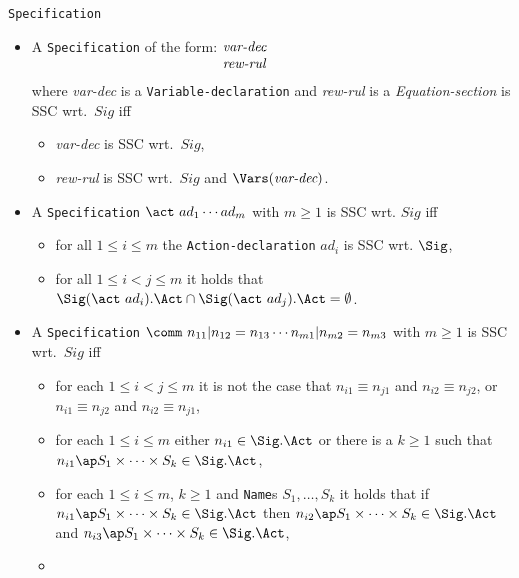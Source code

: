 \documentclass[twoside,fleqn,a4paper,dvips]{article}
\begin{document}
\begin{Dn-arg}{{\tt Specification}}
\begin{itemize}
\begin{itemize}
if $n_{ik}\equiv n_{jk'}$ for some $1\leq k\leq l_i$ and $1\leq
k'\leq l_j$, then either $k_i\neq k_j$, or $S_{il}\not\equiv
S_{jl}$ for some $1\leq l\leq k_i$,
\item
for all $1\leq i\leq m$ and $1\leq j\leq k_i$ it holds that
$S_{ij}\in \Sig.Sort$ and $S_i\in \Sig.Sort$.
\end{itemize}
\item
A {\tt Specification} of the form:
$\begin{minipage}[t]{7cm}
{\it var-dec}\\
{\it rew-rul}\vspace{2ex}
\end{minipage}$\\
where {\it var-dec} is a {\tt Variable-declaration}
and {\it rew-rul} is a {\it Equation-section}
is SSC wrt.\ $Sig$ iff
\begin{itemize}
\item
{\it var-dec} is SSC wrt.\ $Sig$,
\item
{\it rew-rul} is SSC wrt.\ $Sig$ and $\Vars(\mbox{\it var-dec})$.
\end{itemize}
\item
A {\tt Specification} $\act~ad_1\cdots ad_m$
with $m\geq 1$ is SSC wrt. $Sig$ iff
\begin{itemize}
\item for all $1\leq i\leq m$ the {\tt Action-declaration}
$ad_i$ is SSC wrt.  $\Sig$,
\item for all $1\leq i<j\leq m$ it holds that
$\Sig(\act~ad_i).\Act\cap \Sig(\act~ad_j).\Act=\emptyset$.
\end{itemize}
\item
A {\tt Specification}
$\comm~n_{11}| n_{12}= n_{13}\cdots n_{m1}|
n_{m2}= n_{m3}$ with $m\geq 1$ is SSC wrt.\ $Sig$ iff
\begin{itemize}
\item
for each $1\leq i<j\leq m$ it is not the case that $n_{i1}\equiv n_{j1}$
and $n_{i2}\equiv n_{j2}$, or $n_{i1}\equiv n_{j2}$ and $n_{i2}\equiv
n_{j1}$,
\item
for each $1\leq i\leq m$ either $n_{i1}\in \Sig.\Act$ or there is a 
$k\geq 1$ such that $n_{i1}\ap S_1\times \cdots \times S_k\in \Sig.\Act$,
\item
for each $1\leq i\leq m$, $k\geq 1$ and {\tt Name}s $S_1,\ldots,S_k$ it
holds
that if $n_{i1}\ap S_1\times\cdots\times S_k\in \Sig.\Act$ then
$n_{i2}\ap S_1\times\cdots\times
S_k\in \Sig.\Act$ and $n_{i3}\ap S_1\times\cdots\times S_k\in \Sig.\Act$,
\item

\end{itemize}
\end{itemize}
\end{Dn-arg}
\end{document}
